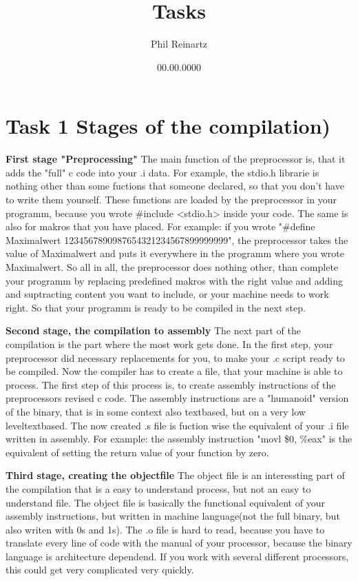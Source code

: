 \documentclass{article}
\title{Tasks}
\author{Phil Reinartz}
\date{00.00.0000}
\begin{document}
\maketitle

\section{Task 1 Stages of the compilation)}

\textbf{First stage "Preprocessing"}
The main function of the preprocessor is, that it adds the "full" c code into your .i data. For example, the stdio.h librarie is nothing other than some fuctions that someone declared, so that you don't have to write them yourself. These functions are loaded by the preprocessor in your programm, because you wrote \#include <stdio.h> inside your code. The same is also for makros that you have placed. For example: if you wrote "\#define Maximalwert 1234567890987654321234567899999999", the preprocessor takes the value of Maximalwert and puts it everywhere in the programm where you wrote Maximalwert. So all in all, the preprocessor does nothing other, than complete your programm by replacing predefined makros with the right value and adding and suptracting content you want to include, or your machine needs to work right.
So that your programm is ready to be compiled in the next step.

\singlespacing

\textbf{Second stage, the compilation to assembly}
The next part of the compilation is the part where the most work gets done. In the first step, your preprocessor did necessary replacements for you, to make your .c script ready to be compiled. Now the compiler has to create a file, that your machine is able to process. The first step of this process is, to create assembly instructions of the preprocessors revised c code. The assembly instructions are a "humanoid" version of the binary, that is in some context also textbased, but on a very low leveltextbased. The now created .s file is fuction wise the equivalent of your .i file written in assembly. For example: the assembly instruction  "movl    \$0, \%eax" is the equivalent of setting the return value of your function by zero.

\singlespacing

\textbf{Third stage, creating the objectfile}
The object file is an interessting part of the compilation that is a easy to understand process, but not an easy to understand file. The object file is basically the functional equivalent of your assembly instructions, but written in machine language(not the full binary, but also writen with 0s and 1s). The .o file is hard to read, because you have to translate every line of code with the manual of your processor, because the binary language is architecture dependend. If you work with several different processors, this could get very complicated very quickly.
\end{document}

